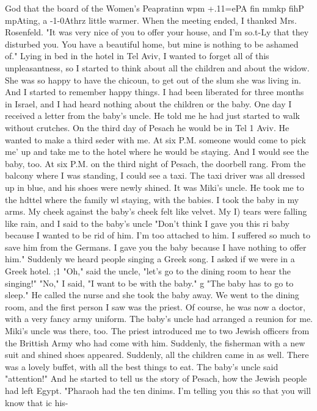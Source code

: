 God that the board of the Women's Peapratinn wpm +.11=ePA fin mmkp fihP mpAting, a -1-0Athrz 
little warmer. 
When the meeting ended, I thanked Mrs. Rosenfeld. "It was very nice of you to offer 
your house, and I'm so.t-Ly that they disturbed you. You have a beautiful home, but mine 
is nothing to be ashamed of." 
Lying in bed in the hotel in Tel Aviv, I wanted to forget all of this unpleasantness, 
so I started to think about all the children and about the widow. She was so happy to 
have the chicoun, to get out of the slum she was living in. And I started to remember 
happy things. 
I had been liberated for three months in Israel, and I had heard nothing about the 
children or the baby. One day I received a letter from the baby's uncle. He told me he 
had just started to walk without crutches. On the third day of Pesach he would be in Tel 1 
Aviv. He wanted to make a third seder with me. At six P.M. someone would come to pick me' 
up and take me to the hotel where he would be staying. And I would see the baby, too. 
At six P.M. on the third night of Pesach, the doorbell rang. From the balcony where 
I was standing, I could see a taxi. The taxi driver was all dressed up in blue, and his 
shoes were newly shined. It was Miki's uncle. He took me to the hdttel where the family wl 
staying, with the babies. 
I took the baby in my arms. My cheek against the baby's cheek felt like velvet. My 
I) 
tears were falling like rain, and I said to the baby's uncle "Don't think I gave you this ri 
baby because I wanted to be rid of him. I'm too attached to him. I suffered so much to 
save him from the Germans. I gave you the baby because I have nothing to offer him." 
Suddenly we heard people singing a Greek song. I asked if we were in a Greek hotel. ;1 
"Oh," said the uncle, "let's go to the dining room to hear the singing!" "No," I said, 
"I want to be with the baby." g "The baby has to go to sleep." He called the nurse and 
she took the baby away. 
We went to the dining room, and the first person I saw was the priest. Of course, he 
was now a doctor, with a very fancy army uniform. The baby's uncle had arranged a reunion 
for me. Miki's uncle was there, too. The priest introduced me to two Jewish officers 
from the Brittish Army who had come with him. Suddenly, the fisherman with a new suit 
and shined shoes appeared. Suddenly, all the children came in as well. 
There was a lovely buffet, with all the best things to eat. The baby's uncle said 
"attention!" And he started to tell us the story of Pesach, how the Jewish people had 
left Egypt. 
"Pharaoh had the ten dinims. I'm telling you this so that you will know that ic his-
